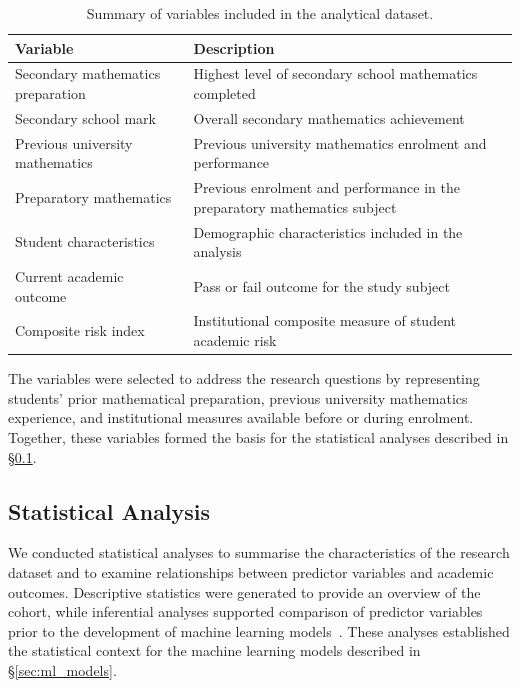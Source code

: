 \begin{table}[ht]
\centering
\caption{Summary of variables included in the analytical dataset.}
\label{tab:variables}

\begin{tabular}{p{} p{}}
\hline
\textbf{Variable} & \textbf{Description} \\
\hline
Secondary mathematics preparation & Highest level of secondary school mathematics completed \\
Secondary school mark & Overall secondary mathematics achievement \\
Previous university mathematics & Previous university mathematics enrolment and performance \\
Preparatory mathematics & Previous enrolment and performance in the preparatory mathematics subject \\
Student characteristics & Demographic characteristics included in the analysis \\
Current academic outcome & Pass or fail outcome for the study subject \\
Composite risk index & Institutional composite measure of student academic risk \\
\hline
\end{tabular}
\end{table}

The variables were selected to address the research questions by representing students' prior mathematical preparation, previous university mathematics experience, and 
institutional measures available before or during enrolment. Together, these variables formed the basis for the statistical analyses described in \S\ref{sec:statistical_analysis}.



\subsection{Statistical Analysis}
\label{sec:statistical_analysis} 

We conducted statistical analyses to summarise the characteristics of the research dataset and to examine relationships between predictor variables and academic outcomes. 
Descriptive statistics were generated to provide an overview of the cohort, while inferential analyses supported comparison of predictor variables prior to the development 
of machine learning models~\cite{Field2013}. These analyses established the statistical context for the machine learning models described in \S\ref{sec:ml_models}.




